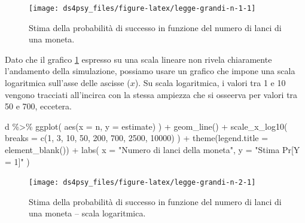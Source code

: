 \documentclass[
  11pt,
]{krantz}
\makeatletter
\newenvironment{Shaded}{\begin{snugshade}}{\end{snugshade}}
\newcommand{\AttributeTok}[1]{\textcolor[rgb]{0.61,0.61,0.61}{#1}}
\newcommand{\DecValTok}[1]{\textcolor[rgb]{0.06,0.06,0.06}{#1}}
\newcommand{\FunctionTok}[1]{\textcolor[rgb]{0,0,0}{#1}}
\newcommand{\NormalTok}[1]{#1}
\newcommand{\SpecialCharTok}[1]{\textcolor[rgb]{0,0,0}{#1}}
\newcommand{\StringTok}[1]{\textcolor[rgb]{0.5,0.5,0.5}{#1}}
\newenvironment{kframe}{%
\medskip{}
\setlength{\fboxsep}{.8em}
 \def\at@end@of@kframe{}%
 \ifinner\ifhmode%
  \def\at@end@of@kframe{\end{minipage}}%
  \begin{minipage}{\columnwidth}%
 \fi\fi%
 \def\FrameCommand##1{\hskip\@totalleftmargin \hskip-\fboxsep
 \colorbox{shadecolor}{##1}\hskip-\fboxsep
     \hskip-\linewidth \hskip-\@totalleftmargin \hskip\columnwidth}%
 \MakeFramed {\advance\hsize-\width
   \@totalleftmargin\z@ \linewidth\hsize
   \@setminipage}}%
 {\par\unskip\endMakeFramed%
 \at@end@of@kframe}
\renewenvironment{Shaded}{\begin{kframe}}{\end{kframe}}
\theoremstyle{definition}
\theoremstyle{definition}
\theoremstyle{definition}
\theoremstyle{definition}
\theoremstyle{remark}
\makeatother
\begin{document}
\begin{figure}[h]

{\centering \texttt{[image: ds4psy\_files/figure-latex/legge-grandi-n-1-1]} 

}

\caption{Stima della probabilità di successo in funzione del numero di lanci di una moneta.}\label{fig:legge-grandi-n-1}
\end{figure}

Dato che il grafico \ref{fig:legge-grandi-n-1} espresso su una scala lineare non rivela chiaramente l'andamento della simulazione, possiamo usare un grafico che impone una scala logaritmica sull'asse delle ascisse (\(x\)). Su scala logaritmica, i valori tra 1 e 10 vengono tracciati all'incirca con la stessa ampiezza che si osseerva per valori tra 50 e 700, eccetera.

\begin{Shaded}
\begin{Highlighting}[]
\NormalTok{d }\SpecialCharTok{\%\textgreater{}\%} 
  \FunctionTok{ggplot}\NormalTok{(}
    \FunctionTok{aes}\NormalTok{(}\AttributeTok{x =}\NormalTok{ n, }\AttributeTok{y =}\NormalTok{ estimate)}
\NormalTok{  ) }\SpecialCharTok{+}
  \FunctionTok{geom\_line}\NormalTok{() }\SpecialCharTok{+}
  \FunctionTok{scale\_x\_log10}\NormalTok{(}
    \AttributeTok{breaks =} \FunctionTok{c}\NormalTok{(}\DecValTok{1}\NormalTok{, }\DecValTok{3}\NormalTok{, }\DecValTok{10}\NormalTok{, }\DecValTok{50}\NormalTok{, }\DecValTok{200}\NormalTok{, }
               \DecValTok{700}\NormalTok{, }\DecValTok{2500}\NormalTok{, }\DecValTok{10000}\NormalTok{)}
\NormalTok{  ) }\SpecialCharTok{+}
  \FunctionTok{theme}\NormalTok{(}\AttributeTok{legend.title =} \FunctionTok{element\_blank}\NormalTok{()) }\SpecialCharTok{+}
  \FunctionTok{labs}\NormalTok{(}
    \AttributeTok{x =} \StringTok{"Numero di lanci della moneta"}\NormalTok{, }
    \AttributeTok{y =} \StringTok{"Stima Pr[Y = 1]"}
\NormalTok{)}
\end{Highlighting}
\end{Shaded}

\begin{figure}[h]

{\centering \texttt{[image: ds4psy\_files/figure-latex/legge-grandi-n-2-1]} 

}

\caption{Stima della probabilità di successo in funzione del numero di lanci di una moneta -- scala logaritmica.}\label{fig:legge-grandi-n-2}
\end{figure}
\end{document}
